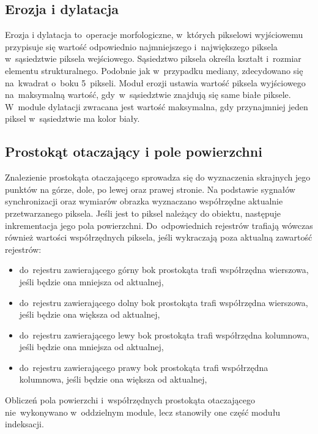 \subsection{Erozja i dylatacja}
\label{subsec:erozja}

Erozja i dylatacja to~operacje morfologiczne, w~których pikselowi wyjściowemu przypisuje się wartość odpowiednio najmniejszego i~największego piksela w~sąsiedztwie piksela wejściowego. 
Sąsiedztwo piksela określa kształt i~rozmiar elementu strukturalnego. 
Podobnie jak w~przypadku mediany, zdecydowano się na~kwadrat o~boku 5~pikseli. 
Moduł erozji ustawia wartość piksela wyjściowego na~maksymalną wartość, gdy~w~sąsiedztwie znajdują się same białe piksele. 
W~module dylatacji zwracana jest wartość maksymalna, gdy przynajmniej jeden piksel w~sąsiedztwie ma kolor biały. 

\subsection{Prostokąt otaczający i pole powierzchni}
\label{subsec:prostokat_otaczajacy}

Znalezienie prostokąta otaczającego sprowadza się do wyznaczenia skrajnych jego punktów na górze, dole, po lewej oraz prawej stronie. Na podstawie sygnałów synchronizacji oraz wymiarów obrazka wyznaczano współrzędne aktualnie przetwarzanego piksela. 
Jeśli jest to piksel należący do obiektu, następuje inkrementacja jego pola powierzchni. Do~odpowiednich rejestrów trafiają wówczas również wartości współrzędnych piksela, jeśli wykraczają poza aktualną zawartość rejestrów:
\begin{itemize}
	\item do~rejestru zawierającego górny bok prostokąta trafi współrzędna wierszowa, jeśli będzie ona mniejsza od aktualnej,
	\item do~rejestru zawierającego dolny bok prostokąta trafi współrzędna wierszowa, jeśli będzie ona większa od aktualnej,
	\item do~rejestru zawierającego lewy bok prostokąta trafi współrzędna kolumnowa, jeśli będzie ona mniejsza od aktualnej,
	\item do~rejestru zawierającego prawy bok prostokąta trafi współrzędna kolumnowa, jeśli będzie ona większa od aktualnej,
\end{itemize}  %
Obliczeń pola powierzchi i~współrzędnych prostokąta otaczającego nie~wykonywano w~oddzielnym module, lecz stanowiły one część modułu indeksacji.

